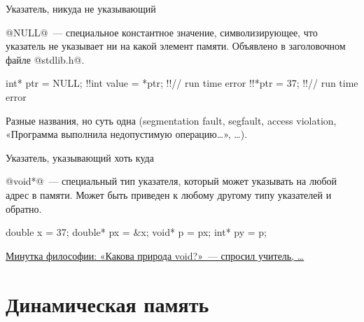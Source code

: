 

\begin{frame}[fragile]{Указатель, никуда не указывающий}

  @NULL@~--- специальное константное значение, символизирующее, что указатель
  не указывает ни на какой элемент памяти.
  Объявлено в заголовочном файле @stdlib.h@.

  \begin{clisting}[escapechar=\!]
    int* ptr = NULL;
    !!int value = *ptr; !!// run time error
    !!*ptr = 37; !!// run time error
  \end{clisting}

  Разные названия, но суть одна (segmentation fault, segfault, access
  violation, «Программа выполнила недопустимую операцию…», …).

\end{frame}

\begin{frame}[fragile]{Указатель, указывающий хоть куда}

  @void*@~--- специальный тип указателя, который может указывать на любой адрес
  в памяти. Может быть приведен к любому другому типу указателей и обратно.

  \begin{clisting}[escapechar=\!]
    double x = 37;
    double* px = &x;
    void* p = px;
    int* py = p;
  \end{clisting}

  \pause
  \href{%
    http://thecodelesscode.com/case/5?lang=ru%
  }{%
    Минутка философии: «Какова природа void?»~--- спросил учитель, …
  }

\end{frame}


\section{Динамическая память}

